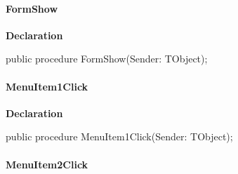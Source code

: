 \documentclass{report}
\newif\ifpdf
\begin{document}
\paragraph*{FormShow}\hspace*{\fill}

\label{mnupdate.TForm1-FormShow}
\begin{list}{}{
\setlength{\itemindent}{0cm}
\setlength{\listparindent}{0cm}
\setlength{\leftmargin}{\evensidemargin}
\addtolength{\leftmargin}{\tmplength}
\settowidth{\labelsep}{X}
\addtolength{\leftmargin}{\labelsep}
\setlength{\labelwidth}{\tmplength}
}
\item[\textbf{Declaration}\hfill]
\ifpdf
\begin{flushleft}
\fi
\begin{ttfamily}
public procedure FormShow(Sender: TObject);\end{ttfamily}

\ifpdf
\end{flushleft}
\fi

\end{list}
\paragraph*{MenuItem1Click}\hspace*{\fill}

\label{mnupdate.TForm1-MenuItem1Click}
\begin{list}{}{
\setlength{\itemindent}{0cm}
\setlength{\listparindent}{0cm}
\setlength{\leftmargin}{\evensidemargin}
\addtolength{\leftmargin}{\tmplength}
\settowidth{\labelsep}{X}
\addtolength{\leftmargin}{\labelsep}
\setlength{\labelwidth}{\tmplength}
}
\item[\textbf{Declaration}\hfill]
\ifpdf
\begin{flushleft}
\fi
\begin{ttfamily}
public procedure MenuItem1Click(Sender: TObject);\end{ttfamily}

\ifpdf
\end{flushleft}
\fi

\end{list}
\paragraph*{MenuItem2Click}\hspace*{\fill}
\end{document}
